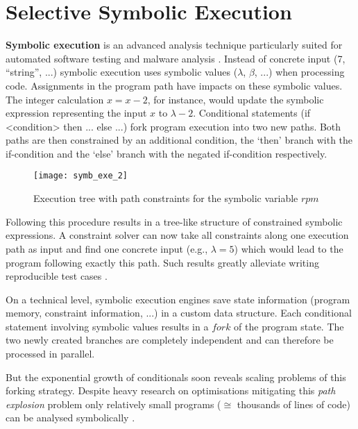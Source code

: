 \section{Selective Symbolic Execution}\label{sec:s2e}



\textbf{Symbolic execution} is an advanced analysis technique particularly suited for automated software testing  and malware analysis .
Instead of concrete input (7, ``string'', ...) symbolic execution uses symbolic values ($\lambda$, $\beta$, ...) when processing code.
Assignments in the program path have impacts on these symbolic values.
The integer calculation $x = x - 2$, for instance, would update the symbolic expression representing the input $x$ to $\lambda - 2$.
Conditional statements (if <condition> then ... else ...) fork program execution into two new paths.
Both paths are then constrained by an additional condition, the `then' branch with the if-condition and the `else' branch with the negated if-condition respectively.

\begin{figure}
\texttt{[image: symb\_exe\_2]}
\caption{Execution tree with path constraints for the symbolic variable $rpm$ \cite{chip14s2e}}
\label{fig:arch}
\end{figure}

Following this procedure results in a tree-like structure of constrained symbolic expressions.
A constraint solver can now take all constraints along one execution path as input and find one concrete input (e.g., $\lambda = 5$) which would lead to the program following exactly this path.
Such results greatly alleviate writing reproducible test cases \cite{chip09sel}.

On a technical level, symbolic execution engines save state information (program memory, constraint information, ...) in a custom data structure.
Each conditional statement involving symbolic values results in a $fork$ of the program state.
The two newly created branches are completely independent and can therefore be processed in parallel.

But the exponential growth of conditionals soon reveals scaling problems of this forking strategy.
Despite heavy research on optimisations mitigating this \textit{path explosion} problem  only relatively small programs ($\cong$ thousands of lines of code) can be analysed symbolically \cite{chip09sel}.

